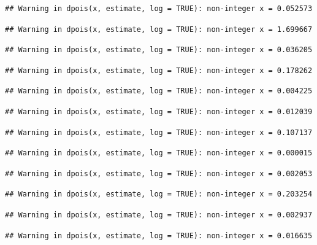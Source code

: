 \documentclass[]{article}
\begin{document}
\begin{verbatim}
## Warning in dpois(x, estimate, log = TRUE): non-integer x = 0.052573
\end{verbatim}

\begin{verbatim}
## Warning in dpois(x, estimate, log = TRUE): non-integer x = 1.699667
\end{verbatim}

\begin{verbatim}
## Warning in dpois(x, estimate, log = TRUE): non-integer x = 0.036205
\end{verbatim}

\begin{verbatim}
## Warning in dpois(x, estimate, log = TRUE): non-integer x = 0.178262
\end{verbatim}

\begin{verbatim}
## Warning in dpois(x, estimate, log = TRUE): non-integer x = 0.004225
\end{verbatim}

\begin{verbatim}
## Warning in dpois(x, estimate, log = TRUE): non-integer x = 0.012039
\end{verbatim}

\begin{verbatim}
## Warning in dpois(x, estimate, log = TRUE): non-integer x = 0.107137
\end{verbatim}

\begin{verbatim}
## Warning in dpois(x, estimate, log = TRUE): non-integer x = 0.000015
\end{verbatim}

\begin{verbatim}
## Warning in dpois(x, estimate, log = TRUE): non-integer x = 0.002053
\end{verbatim}

\begin{verbatim}
## Warning in dpois(x, estimate, log = TRUE): non-integer x = 0.203254
\end{verbatim}

\begin{verbatim}
## Warning in dpois(x, estimate, log = TRUE): non-integer x = 0.002937
\end{verbatim}

\begin{verbatim}
## Warning in dpois(x, estimate, log = TRUE): non-integer x = 0.016635
\end{verbatim}
\end{document}
